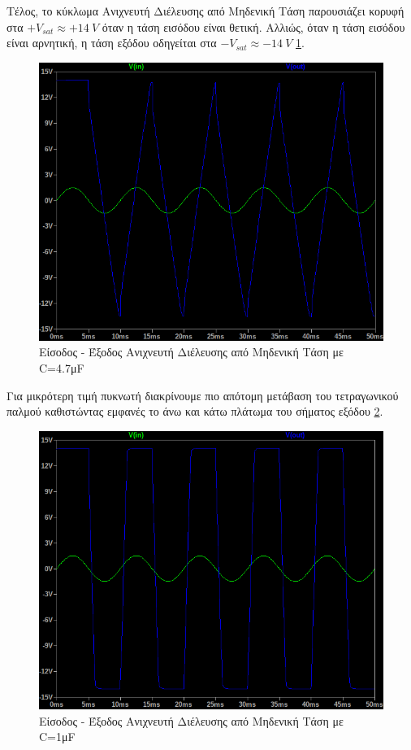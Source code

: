 \documentclass[11pt,a4paper,twoside,onecolumn,openright,final]{memoir}
\begin{document}
Τέλος, το κύκλωμα Ανιχνευτή Διέλευσης από Μηδενική Τάση παρουσιάζει κορυφή στα $+V_{sat} \approx +14 \ V$ όταν η τάση εισόδου 
είναι θετική. Αλλιώς, όταν η τάση εισόδου είναι αρνητική, η τάση εξόδου οδηγείται στα $-V_{sat} \approx -14 \ V$ \ref{fig:ex4plot3}.
\begin{figure}[H]
    \centering
    \includegraphics[width=0.8\linewidth]{figures/Exercise4_step6_4dot7u.png}
    \caption{Είσοδος - Έξοδος Ανιχνευτή Διέλευσης από Μηδενική Τάση με C=4.7μF}
    \label{fig:ex4plot3}
\end{figure}
Για μικρότερη τιμή πυκνωτή διακρίνουμε πιο απότομη μετάβαση του τετραγωνικού παλμού καθιστώντας εμφανές το άνω και κάτω πλάτωμα του σήματος εξόδου \ref{fig:ex4plot4}.
\begin{figure}[H]
    \centering
    \includegraphics[width=0.8\linewidth]{figures/Exercise4_step6_1u.png}
    \caption{Είσοδος - Έξοδος Ανιχνευτή Διέλευσης από Μηδενική Τάση με C=1μF}
    \label{fig:ex4plot4}
\end{figure}
\end{document}
